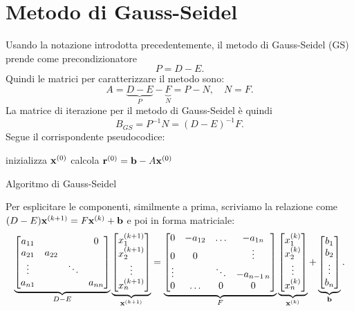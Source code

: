 \section{Metodo di Gauss-Seidel}
Usando la notazione introdotta precedentemente, il metodo di Gauss-Seidel (GS) prende come precondizionatore
\begin{equation*}
P=D-E.
\end{equation*}
Quindi le matrici per caratterizzare il metodo sono:
\begin{equation*}
A=\underbrace{D-E}_{P} -\underbrace{F}_{N} =P-N,\quad N=F.
\end{equation*}
La matrice di iterazione per il metodo di Gauss-Seidel è quindi
\begin{equation*}
B_{GS} =P^{-1} N=( D-E)^{-1} F.
\end{equation*}
Segue il corrispondente pseudocodice: \\
\begin{algo}
	inizializza $\mathbf{x}^{(0)}$\;
	calcola $\mathbf{r}^{(0)} =\mathbf{b} -A\mathbf{x}^{(0)}$\;
	\caption{Algoritmo di Gauss-Seidel}
\end{algo}
Per esplicitare le componenti, similmente a prima, scriviamo la relazione come $( D-E)\mathbf{x}^{( k+1)} =F\mathbf{x}^{(k)} +\mathbf{b}$ e poi in forma matriciale:
\begin{equation*}
\underbrace{\begin{bmatrix}
a_{11} &  &  & 0\\
a_{21} & a_{22} &  & \\
\vdots  &  & \ddots  & \\
a_{n1} &  &  & a_{nn}
\end{bmatrix}}_{D-E}\underbrace{\begin{bmatrix}
x^{( k+1)}_{1}\\
x^{( k+1)}_{2}\\
\vdots \\
x^{( k+1)}_{n}
\end{bmatrix}}_{\mathbf{x}^{( k+1)}} =\underbrace{\begin{bmatrix}
0 & -a_{12} & \dotsc  & -a_{1 n}\\
0 & 0 &  & \vdots \\
\vdots  &  & \ddots  & -a_{n-1 \, n}\\
0 & \dotsc  & 0 & 0
\end{bmatrix}}_{F}\underbrace{\begin{bmatrix}
x^{(k)}_{1}\\
x^{(k)}_{2}\\
\vdots \\
x^{(k)}_{n}
\end{bmatrix}}_{\mathbf{x}^{(k)}} +\underbrace{\begin{bmatrix}
b_{1}\\
b_{2}\\
\vdots \\
b_{n}
\end{bmatrix}}_{\mathbf{b}}.
\end{equation*}
